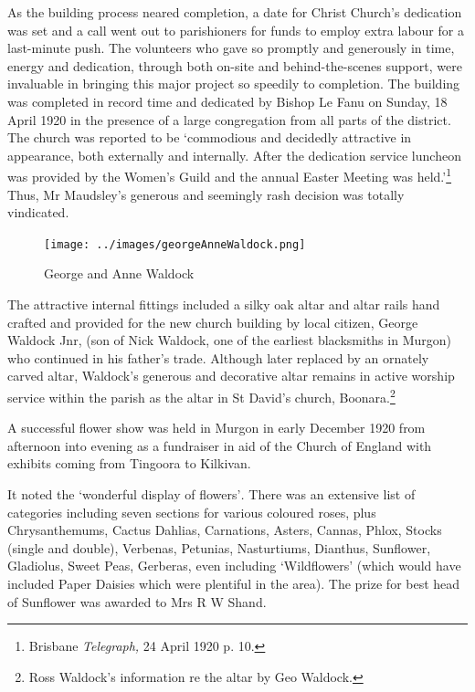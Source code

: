 As the building process neared completion, a date for Christ Church's dedication was set and a call went out to parishioners for funds to employ extra labour for a last-minute push. The volunteers who gave so promptly and generously in time, energy and dedication, through both on-site and behind-the-scenes support, were invaluable in bringing this major project so speedily to completion. The building was completed in record time and dedicated by Bishop Le Fanu on Sunday, 18 April 1920 in the presence of a large congregation from all parts of the district. The church was reported to be `commodious and decidedly attractive in appearance, both externally and internally. After the dedication service luncheon was provided by the Women's Guild and the annual Easter Meeting was held.'\footnote{Brisbane \emph{Telegraph,} 24 April 1920 p. 10.} Thus, Mr Maudsley's generous and seemingly rash decision was totally vindicated.








\begin{figure}
\begin{center}
\texttt{[image: ../images/georgeAnneWaldock.png]}
\caption{George and Anne Waldock}
\end{center}
\end{figure}




The attractive internal fittings included a silky oak altar and altar rails hand crafted and provided for the new church building by local citizen, George Waldock Jnr, (son of Nick Waldock, one of the earliest blacksmiths in Murgon) who continued in his father's trade. Although later replaced by an ornately carved altar, Waldock's generous and decorative altar remains in active worship service within the parish as the altar in St David's church, Boonara.\footnote{Ross Waldock's information re the altar by Geo Waldock.}


A successful flower show was held in Murgon in early December 1920 from afternoon into evening as a fundraiser in aid of the Church of England with exhibits coming from Tingoora to Kilkivan.



It noted the `wonderful display of flowers'\emph{.} There was an extensive list of categories including seven sections for various coloured roses, plus Chrysanthemums, Cactus Dahlias, Carnations, Asters, Cannas, Phlox, Stocks (single and double), Verbenas, Petunias, Nasturtiums, Dianthus, Sunflower, Gladiolus, Sweet Peas, Gerberas, even including `Wildflowers' (which would have included Paper Daisies which were plentiful in the area). The prize for best head of Sunflower was awarded to Mrs R W Shand.




